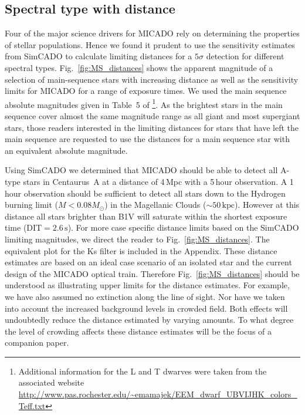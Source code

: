 \subsection{Spectral type with distance}


Four of the major science drivers for MICADO rely on determining the properties of stellar populations. Hence we found it prudent to use the sensitivity estimates from SimCADO to calculate limiting distances for a $5\sigma$ detection for different spectral types. Fig.~\ref{fig:MS_distances} shows the apparent magnitude of a selection of main-sequence stars with increasing distance as well as the sensitivity limits for MICADO for a range of exposure times. 
We used the main sequence absolute magnitudes given in Table~5 of \citet{pecaut2013}\footnote{Additional information for the L and T dwarves \citep[not reported by][]{pecaut2013} were taken from the associated website \url{http://www.pas.rochester.edu/~emamajek/EEM_dwarf_UBVIJHK_colors_Teff.txt}}. As the brightest stars in the main sequence cover almost the same magnitude range as all giant and most supergiant stars, those readers interested in the limiting distances for stars that have left the main sequence are requested to use the distances for a main sequence star with an equivalent absolute magnitude. 

Using SimCADO we determined that MICADO should be able to detect all A-type stars in Centaurus~A at a distance of 4\,Mpc with a 5\,hour observation. A 1\,hour observation should be sufficient to detect all stars down to the Hydrogen burning limit ($M < 0.08 M_{\odot}$) in the Magellanic Clouds ($\sim 50\,\mathrm{kpc}$). However at this distance all stars brighter than B1V will saturate within the shortest exposure time ($\mathrm{DIT} =2.6\,\mathrm{s}$). For more case specific distance limits based on the SimCADO limiting magnitudes, we direct the reader to Fig.~\ref{fig:MS_distances}. The equivalent plot for the Ks filter is included in the Appendix. These distance estimates are based on an ideal case scenario of an isolated star and the current design of the MICADO optical train. Therefore Fig.~\ref{fig:MS_distances} should be understood as illustrating upper limits for the distance estimates. For example, we have also assumed no extinction along the line of sight. Nor have we taken into account the increased background levels in crowded field. Both effects will undoubtedly reduce the distance estimated by varying amounts. To what degree the level of crowding affects these distance estimates will be the focus of a companion paper.


